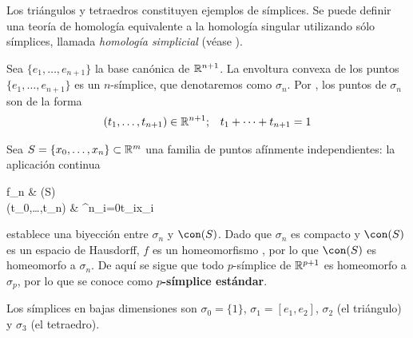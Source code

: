 \begin{marginfigure}
\caption[Triángulo y tetraedro]{Los triángulos y tetraedros constituyen ejemplos de símplices.
Se puede definir una teoría de homología equivalente a la homología singular utilizando sólo símplices, llamada \emph{homología simplicial} (véase \cite{Hatcher}).}
\end{marginfigure}

Sea $\{e_1, \dots, e_{n+1}\}$ la base canónica de $\mathbb{R}^{n+1}$.
La envoltura convexa de los puntos $\{e_1, \dots, e_{n+1}\}$ es un $n$-símplice, que denotaremos como $\sigma_n$.
Por , los puntos de $\sigma_n$ son de la forma
\begin{align*}
	(t_1,\dots,t_{n+1}) \in \mathbb{R}^{n+1}; && t_1+\dots+t_{n+1}=1
\end{align*}

Sea $S=\{x_0,\dots,x_n\}\subset \mathbb{R}^m$ una familia de puntos afínmente independientes: la aplicación continua
\begin{funcion*}
	f\colon \sigma_n \arrow[r]           & \con(S)            \\
	{(t_0,\dots,t_n)} \arrow[r, maps to] & \displaystyle\sum^n_{i=0}t_ix_i
\end{funcion*}
establece una biyección entre $\sigma_n$ y $\con(S)$.
Dado que $\sigma_n$ es compacto y $\con(S)$ es un espacio de Hausdorff, $f$ es un homeomorfismo , por lo que $\con(S)$ es homeomorfo a $\sigma_n$.
De aquí se sigue que todo $p$-símplice de $\mathbb{R}^{p+1}$ es homeomorfo a $\sigma_p$, por lo que se conoce como \textbf{$p$-símplice estándar}.

\begin{example}
	Los símplices en bajas dimensiones son $\sigma_0=\{1\}$, $\sigma_1=[e_1,e_2]$, $\sigma_2$ (el triángulo) y $\sigma_3$ (el tetraedro).
\end{example}

